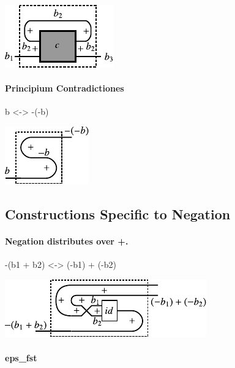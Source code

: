 \documentclass[preprint]{sigplanconf}
\begin{document}
\begin{center}
  \includegraphics{diagrams/trace.pdf}
\end{center}

\paragraph*{Principium Contradictiones}

{{b <-> -(-b)}}

\begin{center}
  \includegraphics{diagrams/double_neg.pdf}
\end{center}

\subsection{Constructions Specific to Negation}
\label{sec:neg-constructions}

\paragraph*{Negation distributes over {{+}}. }

{{-(b1 + b2) <-> (-b1) + (-b2)}}

\begin{center}
  \includegraphics{diagrams/dist_neg_plus.pdf}
\end{center}

\paragraph*{ {{eps_{fst} }} }
\end{document}
